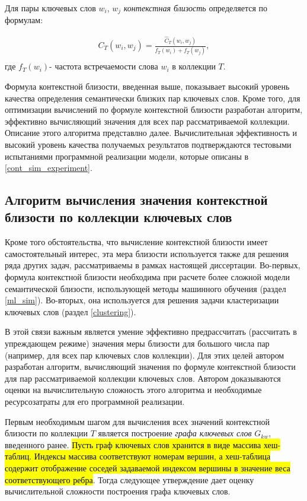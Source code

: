 Для пары ключевых слов $w_i$, $w_j$ \emph{контекстная близость} определяется по формулам:

\begin{equation}
    \begin{aligned}
        C_T(w_i, w_j) = \frac{\hat{C}_{T}(w_i, w_j)}{f_{T}(w_i) + f_{T}(w_j)},\\
    \end{aligned}
\label{eq:test}
\end{equation}
где $f_{T}(w_i)$- частота встречаемости слова $w_i$ в коллекции $T$.

Формула контекстной близости, введенная выше, показывает высокий уровень качества определения семантически близких пар ключевых слов. Кроме того, для оптимизации вычислений по формуле контекстной близости разработан алгоритм, эффективно вычисляющий значения для всех пар рассматриваемой коллекции. Описание этого алгоритма представлно далее. Вычислительная эффективность и высокий уровень качества получаемых результатов подтверждаются тестовыми испытаниями программной реализации модели, которые описаны в \ref{cont_sim_experiment}.

\subsection{Алгоритм вычисления значения контекстной близости по коллекции ключевых слов}

Кроме того обстоятельства, что вычисление контекстной близости имеет самостоятельный интерес, эта мера близости используется также для решения ряда других задач, рассматриваемы в рамках настоящей диссертации. Во-первых, формула контекстной близости необходима при расчете более сложной модели семантической близости, использующей методы машинного обучения (раздел \ref{ml_sim}). Во-вторых, она используется для решения задачи кластеризации ключевых слов (раздел \ref{clustering}).

В этой связи важным является умение эффективно предрассчитать (рассчитать в упреждающем режиме) значения меры близости для большого числа пар (например, для всех пар ключевых слов коллекции). Для этих целей автором разработан алгоритм, вычисляющий значения по формуле контекстной близости для пар рассматриваемой коллекции ключевых слов. Автором доказываются оценки на вычислительную сложность этого алгоритма и необходимые ресурсозатраты для его программной реализации.

Первым необходимым шагом для вычисления всех значений контекстной близости по коллекции $T$ является построение \emph{графа ключевых слов} $G_{kw}$, введенного ранее. \hl{Пусть граф ключевых слов хранится в виде массива хеш-таблиц. Индексы массива соответствуют номерам вершин, а хеш-таблица содержит отображение соседей задаваемой индексом вершины в значение веса соответствующего ребра}. Тогда следующее утверждение дает оценку вычислительной сложности построения графа ключевых слов.


